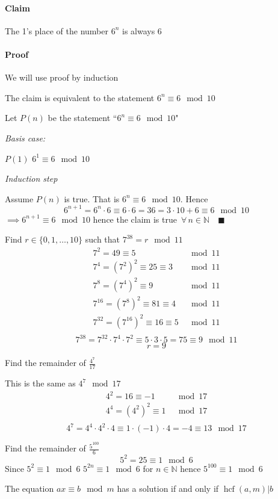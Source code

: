 \documentclass{article}
\newcommand{\bb}[1]{\mathbb{#1}}
\newcommand{\A}{\,\forall\,}
\newcommand{\hcf}{\operatorname{hcf}}
\begin{document}
\paragraph{Claim} The 1's place of the number \(6^n\) is always 6

\paragraph{Proof} We will use proof by induction

The claim is equivalent to the statement \(6^n\equiv 6\mod 10\)

Let \(P(n)\) be the statement ``\(6^n\equiv 6\mod 10\)"

\emph{Basis case:}

\(P(1)\) \(6^1\equiv 6\mod 10\)

\emph{Induction step}

Assume \(P(n)\) is true. That is \(6^n\equiv 6\mod10\). Hence
\[6^{n+1}=6^n\cdot 6\equiv6\cdot6=36=3\cdot10+6\equiv6\mod 10\]
\(\implies6^{n+1}\equiv 6\mod 10\) hence the claim is true \(\A n\in\bb N\quad\blacksquare\)

Find \(r\in\{0,1,\dotsc,10\}\) such that \(7^{38}=r\mod 11\)
\begin{align*}
7^2 = 49\equiv 5&\mod11\\
7^4 =(7^2)^2\equiv25\equiv 3&\mod11\\
7^8 =(7^4)^2\equiv 9&\mod11\\
7^{16} = (7^8)^2\equiv81\equiv4&\mod11\\
7^{32} = (7^{16})^2\equiv16\equiv5&\mod11\\
\end{align*}
\[7^{38}=7^{32}\cdot7^4\cdot7^2\equiv5\cdot3\cdot5=75\equiv 9\mod 11\]
\[r=9\]

Find the remainder of \(\frac{4^7}{17}\)

This is the same as \(4^7\mod 17\)
\begin{align*}
4^2=16\equiv-1 &\mod 17\\
4^4=(4^2)^2\equiv1 &\mod 17\\
\end{align*}
\[4^7=4^4\cdot4^2\cdot4\equiv1\cdot(-1)\cdot4=-4\equiv13\mod 17\]

Find the remainder of \(\frac{5^{100}}{6}\)
\[5^2=25\equiv1\mod 6\]
Since \(5^2\equiv1\mod 6\) \(5^{2n}\equiv1\mod 6\) for \(n\in\bb N\) hence \(5^{100}\equiv1\mod 6\)

The equation \(ax\equiv b\mod m\) has a solution if and only if \(\hcf(a,m)|b\)
\end{document}
